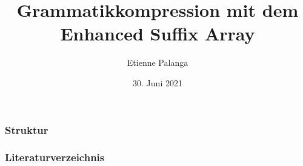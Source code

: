 

\title{Grammatikkompression mit dem Enhanced Suffix Array}
\author{Etienne Palanga}
\date{30. Juni 2021}






%






\frame{\titlepage}


\begin{frame}
    \frametitle{Struktur}
	\tableofcontents
\end{frame}










\begin{frame}[allowframebreaks]
	\frametitle{Literaturverzeichnis}
    \printbibliography 
\end{frame}






